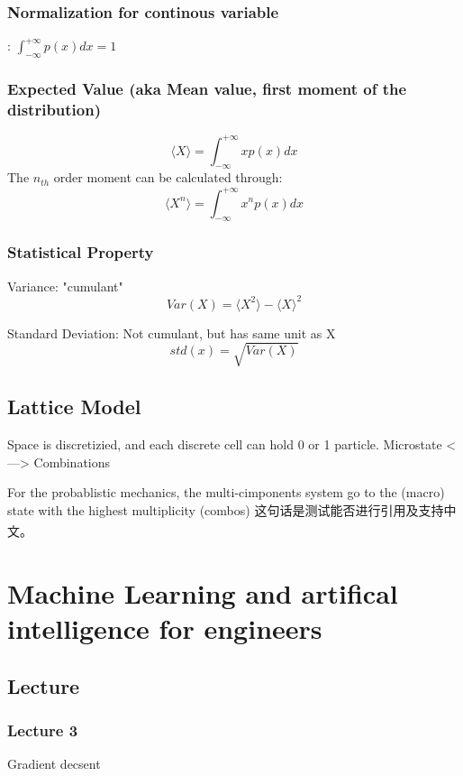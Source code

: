 \documentclass[a4paper]{article}
\newcommand{\upcite}[1]{\textsuperscript{\cite{#1}}}
\begin{document}
\subsubsection{Normalization for continous variable}:
$\int_{-\infty}^{+\infty} p(x)dx = 1$
\subsubsection{Expected Value (aka Mean value, first moment of the distribution)}
\begin{equation}
	\langle X \rangle=\int_{-\infty}^{+\infty}xp(x)dx
\end{equation}
The $n_{th}$ order moment can be calculated through:
\begin{equation}
	\langle X^{n} \rangle = \int_{-\infty}^{+\infty}x^{n}p(x) dx
\end{equation}

\subsubsection{Statistical Property}
Variance: "cumulant"
\begin{equation}
	Var(X)=\langle X^{2} \rangle - {\langle X \rangle}^{2}
\end{equation}

Standard Deviation: Not cumulant, but has same unit as X
\begin{equation}
	std(x)=\sqrt{Var(X)}
\end{equation}

\subsection{Lattice Model}
Space is discretizied, and each discrete cell can hold 0 or 1 particle.
Microstate <---> Combinations

For the probablistic mechanics, the multi-cimponents system go to the (macro) state with the highest multiplicity (combos)
这句话是测试能否进行引用及支持中文\upcite{1}。

\section{Machine Learning and artifical intelligence for engineers}
\subsection{Lecture}
\subsubsection{Lecture 3}
Gradient decsent 
\end{document}
